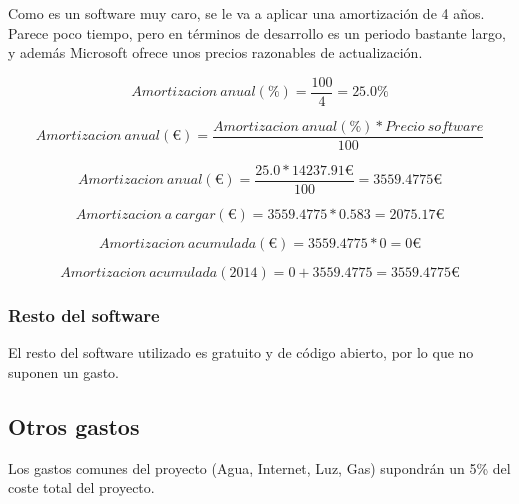 Como es un software muy caro, se le va a aplicar una amortizaci\'on de 4 a\~nos.
Parece poco tiempo, pero en t\'erminos de desarrollo es un periodo bastante largo, y adem\'as
Microsoft ofrece unos precios razonables de actualizaci\'on.

\begin{center}
\begin{equation}
Amortizacion \ anual (\%) = \frac{100}{4} = 25.0 \%
\end{equation}

\begin{equation}
Amortizacion \ anual (€) = \frac{Amortizacion \ anual(\%) * Precio \ software}{100}
\end{equation}

\begin{equation}
Amortizacion \ anual (€) = \frac{25.0 * 14237.91 €}{100} = 3559.4775 €
\end{equation}

\begin{equation}
Amortizacion \ a \ cargar (€) = 3559.4775 * 0.583 = 2075.17 €
\end{equation}

\begin{equation}
Amortizacion \ acumulada (€) = 3559.4775 * 0 = 0 €
\end{equation}

\begin{equation}
Amortizacion \ acumulada (2014) = 0 + 3559.4775 = 3559.4775 €
\end{equation} 
\end{center} 

\subsubsection{Resto del software}
El resto del software utilizado es gratuito y de c\'odigo abierto, por lo que no suponen
un gasto.

\subsection{Otros gastos}
Los gastos comunes del proyecto (Agua, Internet, Luz, Gas) supondr\'an un 5\% del coste
total del proyecto.

